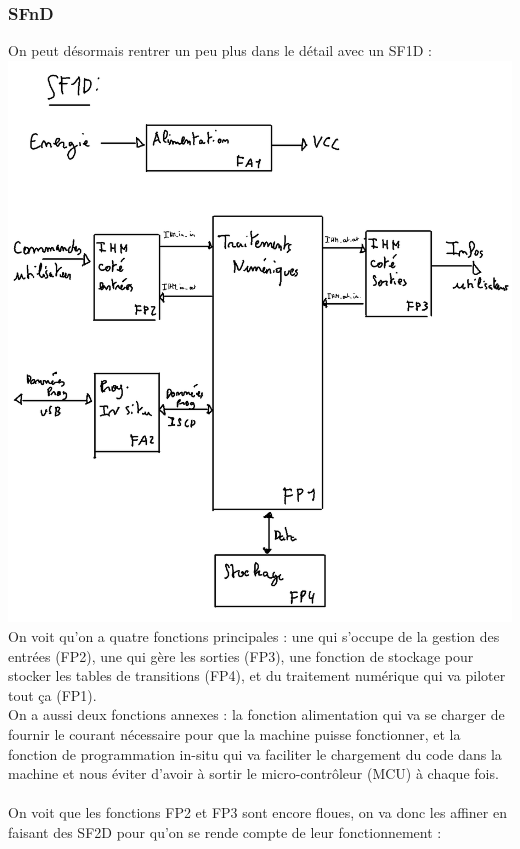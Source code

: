 \documentclass[12pt]{report}
\begin{document}
	\subsubsection{SFnD}
	On peut désormais rentrer un peu plus dans le détail avec un SF1D :\\
	\includegraphics[width=\textwidth]{img/SF1D}
	On voit qu'on a quatre fonctions principales : une qui s'occupe de la gestion des entrées (FP2), une qui gère les sorties (FP3), une fonction de stockage pour stocker les tables de transitions (FP4), et du traitement numérique qui va piloter tout ça (FP1).\\
	On a aussi deux fonctions annexes : la fonction alimentation qui va se charger de fournir le courant nécessaire pour que la machine puisse fonctionner, et la fonction de programmation in-situ qui va faciliter le chargement du code dans la machine et nous éviter d'avoir à sortir le micro-contrôleur (MCU) à chaque fois.\\
	\\
	On voit que les fonctions FP2 et FP3 sont encore floues, on va donc les affiner en faisant des SF2D pour qu'on se rende compte de leur fonctionnement :\\
\end{document}

